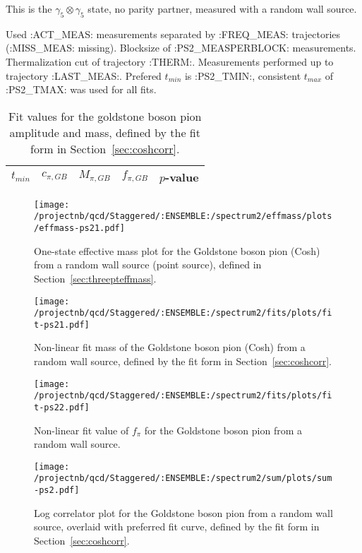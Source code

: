 This is the $\gamma_5 \otimes \gamma_5$ state, no parity partner, measured with a random wall source.

{\small{Used :ACT_MEAS: measurements separated by :FREQ_MEAS: trajectories (:MISS_MEAS: missing). Blocksize of :PS2_MEASPERBLOCK: measurements. Thermalization cut of trajectory :THERM:. Measurements performed up to trajectory :LAST_MEAS:. Prefered $t_{min}$ is :PS2_TMIN:, consistent $t_{max}$ of :PS2_TMAX: was used for all fits.}}

\begin{table}[ht!]
\centering
\scriptsize
\begin{tabular}{|c|c|c|c|c|}
\hline
 $t_{min}$ & $c_{\pi, GB}$ &  $M_{\pi, GB}$ & $f_{\pi,GB}$ & $p$-value \\
\hline

\end{tabular}
\caption{Fit values for the goldstone boson pion amplitude and mass, defined by the fit form in Section~\ref{sec:coshcorr}.}
\end{table}

\begin{multicols}{2}
\begin{figure}[H]
\centering
\texttt{[image: /projectnb/qcd/Staggered/:ENSEMBLE:/spectrum2/effmass/plots/effmass-ps21.pdf]}
\caption{One-state effective mass plot for the Goldstone boson pion (Cosh) from a random wall source (point source), defined in Section~\ref{sec:threepteffmass}.}
\end{figure}
\columnbreak
\begin{figure}[H]
\centering
\texttt{[image: /projectnb/qcd/Staggered/:ENSEMBLE:/spectrum2/fits/plots/fit-ps21.pdf]}
\caption{Non-linear fit mass of the Goldstone boson pion (Cosh) from a random wall source, defined by the fit form in Section~\ref{sec:coshcorr}.}
\end{figure}
\end{multicols}

\begin{multicols}{2}
\begin{figure}[H]
\centering
\texttt{[image: /projectnb/qcd/Staggered/:ENSEMBLE:/spectrum2/fits/plots/fit-ps22.pdf]}
\caption{Non-linear fit value of $f_\pi$ for the Goldstone boson pion from a random wall source.}
\end{figure}
\columnbreak
\begin{figure}[H]
\centering
\texttt{[image: /projectnb/qcd/Staggered/:ENSEMBLE:/spectrum2/sum/plots/sum-ps2.pdf]}
\caption{Log correlator plot for the Goldstone boson pion from a random wall source, overlaid with preferred fit curve, defined by the fit form in Section~\ref{sec:coshcorr}.}
\end{figure}
\end{multicols}


